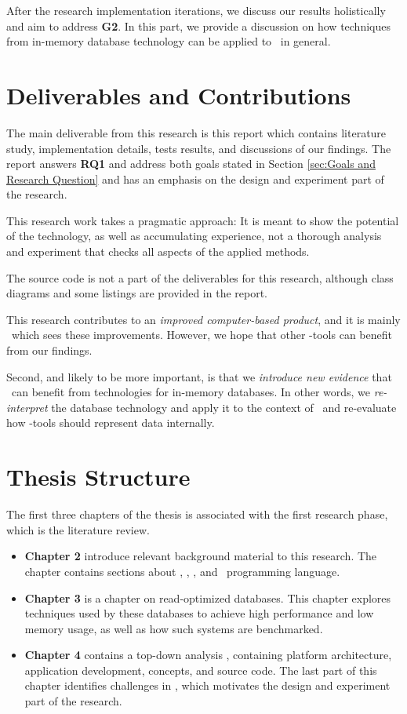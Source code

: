 After the research implementation iterations, we discuss our results holistically and aim to address \textbf{G2}. In this part, we provide a discussion on how techniques from in-memory database technology can be applied to \mde~in general. 

\section{Deliverables and Contributions}
\label{sec:Deliverables and Contributions}
The main deliverable from this research is this report which contains literature study, implementation details, tests results, and discussions of our findings. The report answers \textbf{RQ1} and address both goals stated in Section \ref{sec:Goals and Research Question} and has an emphasis on the design and experiment part of the research. 

This research work takes a pragmatic approach: It is meant to show the potential of the technology, as well as accumulating experience, not a thorough analysis and experiment that checks all aspects of the applied methods. 

The source code is not a part of the deliverables for this research, although class diagrams and some listings are provided in the report.

This research contributes to an \textit{improved computer-based product}, and it is mainly \gap~which sees these improvements. However, we hope that other \mde-tools can benefit from our findings. 

Second, and likely to be more important, is that we \textit{introduce new evidence} that \mde~can benefit from technologies for in-memory databases. In other words, we \textit{re-interpret} the database technology and apply it to the context of \mde~and re-evaluate how \mdd-tools should represent data internally.


\section{Thesis Structure}
\label{sec:Thesis Structure}
The first three chapters of the thesis is associated with the first research phase, which is the literature review.
\begin{itemize}
    \item \textbf{Chapter 2} introduce relevant background material to this research. The chapter contains sections about \mde, \bi, \bd, and \delphi~programming language.
    \item \textbf{Chapter 3} is a chapter on read-optimized databases. This chapter explores techniques used by these databases to achieve high performance and low memory usage, as well as how such systems are benchmarked. 
    \item \textbf{Chapter 4} contains a top-down analysis \gap, containing platform architecture, application development, concepts, and source code. The last part of this chapter identifies challenges in \gap, which motivates the design and experiment part of the research.
\end{itemize}

